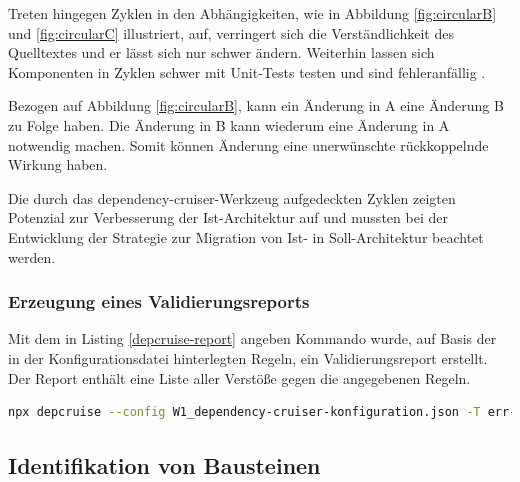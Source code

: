 Treten hingegen Zyklen in den Abhängigkeiten, wie in Abbildung \ref{fig:circularB} und \ref{fig:circularC} illustriert, auf, verringert sich die Verständlichkeit des Quelltextes und er lässt sich nur schwer ändern. Weiterhin lassen sich Komponenten in Zyklen schwer mit Unit-Tests testen und sind fehleranfällig \autocite[vgl.][116-117]{Martin2018}.

Bezogen auf Abbildung \ref{fig:circularB}, kann ein Änderung in A eine Änderung B zu Folge haben. Die Änderung in B kann wiederum eine Änderung in A notwendig machen. Somit können Änderung eine unerwünschte rückkoppelnde Wirkung haben.

Die durch das dependency-cruiser-Werkzeug aufgedeckten Zyklen zeigten Potenzial zur Verbesserung der Ist-Architektur auf und mussten bei der Entwicklung der Strategie zur Migration von Ist- in Soll-Architektur beachtet werden.

\subsubsection{Erzeugung eines Validierungsreports}
Mit dem in Listing \ref{depcruise-report} angeben Kommando wurde, auf Basis der in der Konfigurationsdatei hinterlegten Regeln, ein Validierungsreport erstellt.
Der Report enthält eine Liste aller Verstöße gegen die angegebenen Regeln.
\begin{lstlisting}[language={sh}, label=depcruise-report, caption=Kommando zur Erzeugung eines Validierungsreports]
npx depcruise --config W1_dependency-cruiser-konfiguration.json -T err-html src -f Validierungsreport.html
\end{lstlisting}




\subsection{Identifikation von Bausteinen}



